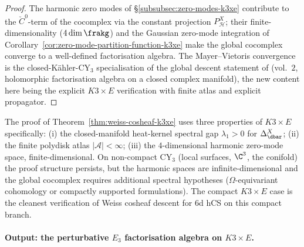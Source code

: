 \begin{proof}
The harmonic zero modes of \S\ref{subsubsec:zero-modes-k3xe} contribute
to the $\check{C}^0$-term of the cocomplex via the constant projection
$P_{\mathcal{H}}^X$; their finite-dimensionality
\textup{(}$4 \dim \frakg$\textup{)} and the Gaussian zero-mode
integration of Corollary~\ref{cor:zero-mode-partition-function-k3xe}
make the global cocomplex converge to a well-defined factorisation
algebra. The Mayer--Vietoris convergence is the closed-K\"ahler-CY$_3$
specialisation of the global descent statement of
\cite{CostelloGwilliam} \textup{(}vol.~$2$, holomorphic factorisation
algebra on a closed complex manifold\textup{)}, the new content here
being the explicit $K3 \times E$ verification with finite atlas and
explicit propagator.
\end{proof}

\begin{remark}
\label{rem:compactness-spectral-gap-finite-atlas}
The proof of Theorem~\ref{thm:weiss-cosheaf-k3xe} uses three properties
of $K3 \times E$ specifically: (i) the closed-manifold heat-kernel
spectral gap $\lambda_1 > 0$ for $\Delta_{\dbar}^X$; (ii) the finite
polydisk atlas $|\mathcal{A}| < \infty$; (iii) the $4$-dimensional
harmonic zero-mode space, finite-dimensional. On non-compact CY$_3$
(local surfaces, $\C^3$, the conifold) the proof structure persists,
but the harmonic spaces are infinite-dimensional and the global
cocomplex requires additional spectral hypotheses
\textup{(}$\Omega$-equivariant cohomology or compactly supported
formulations\textup{).} The compact $K3 \times E$ case is the cleanest
verification of Weiss cosheaf descent for $6$d hCS on this compact branch.
\end{remark}

\paragraph{Output: the perturbative $E_3$ factorisation algebra on $K3 \times E$.}

